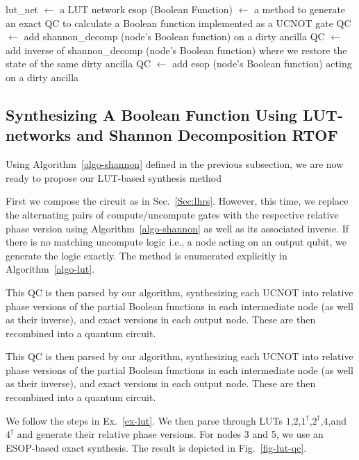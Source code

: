 \begin{algorithm}[tb]
  \caption{lut\_synthesis}
  \label{algo-lut}
  \begin{algorithmic}
    \State lut\_net $\leftarrow$ a LUT network
    \State esop (Boolean Function) $\leftarrow$ a method to generate
    an exact QC to calculate a Boolean function implemented as a UCNOT gate 
    \State QC $\leftarrow$ add shannon\_decomp (node's Boolean function) on a dirty ancilla
    \State QC $\leftarrow$ add inverse of shannon\_decomp (node's 
    Boolean function) where we restore the state of the same dirty ancilla
    \State QC $\leftarrow$ add esop (node's Boolean function) acting on a dirty ancilla
    \EndIf
    \EndFor
  \end{algorithmic}
\end{algorithm}

\subsection{Synthesizing A Boolean Function Using LUT-networks and Shannon Decomposition RTOF}

Using Algorithm~\ref{algo-shannon} defined in the previous subsection, we are now ready to propose our LUT-based synthesis method 

First we compose the circuit as in Sec.~\ref{Sec:lhrs}. However, this time, we replace the alternating pairs of compute/uncompute gates with the respective relative phase version using Algorithm~\ref{algo-shannon} as well as its associated inverse. If there is no matching uncompute logic i.e., a node acting on an output qubit, we generate the logic exactly. The method is enumerated explicitly in Algorithm~\ref{algo-lut}.

This QC is then parsed by our algorithm, synthesizing each UCNOT into relative phase versions of the partial Boolean functions in each intermediate node (as well as their inverse), and exact versions in each output node. These are then recombined into a quantum circuit. 

This QC is then parsed by our algorithm, synthesizing each UCNOT into relative phase versions of the partial Boolean functions in each intermediate node (as well as their inverse), and exact versions in each output node. These are then recombined into a quantum circuit. 

\begin{example}
  \label{ex-lut}
  We follow the steps in Ex.~\ref{ex-lut}. We then parse through LUTs
  $1$,$2$,$1^{\dagger}$,$2^{\dagger}$,$4$,and $4^{\dagger}$ and
  generate their relative phase versions. For nodes 3 and 5, we use an
  ESOP-based exact synthesis. 
  The result is depicted in Fig.~\ref{fig-lut-qc}.
\end{example}

